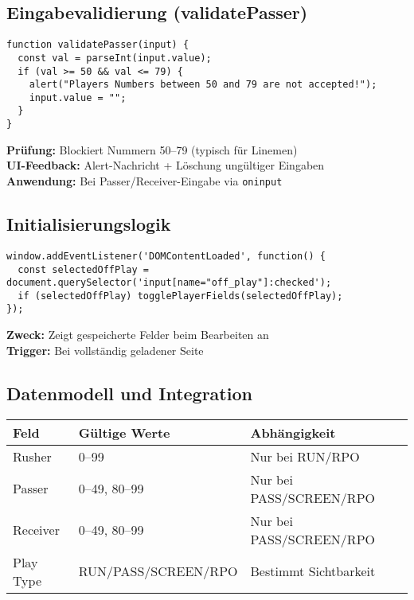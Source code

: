 \documentclass[12pt]{article}
\begin{document}
\subsection{Eingabevalidierung (validatePasser)}

\begin{verbatim}
function validatePasser(input) {
  const val = parseInt(input.value);
  if (val >= 50 && val <= 79) {
    alert("Players Numbers between 50 and 79 are not accepted!");
    input.value = "";
  }
}
\end{verbatim}

\textbf{Prüfung:} Blockiert Nummern 50–79 (typisch für Linemen) \\
\textbf{UI-Feedback:} Alert-Nachricht + Löschung ungültiger Eingaben \\
\textbf{Anwendung:} Bei Passer/Receiver-Eingabe via \texttt{oninput}


\subsection{Initialisierungslogik}

\begin{verbatim}
window.addEventListener('DOMContentLoaded', function() {
  const selectedOffPlay = document.querySelector('input[name="off_play"]:checked');
  if (selectedOffPlay) togglePlayerFields(selectedOffPlay);
});
\end{verbatim}

\textbf{Zweck:} Zeigt gespeicherte Felder beim Bearbeiten an \\
\textbf{Trigger:} Bei vollständig geladener Seite

\subsection{Datenmodell und Integration}

\begin{center}
\begin{tabular}{|l|l|l|}
\hline
\textbf{Feld} & \textbf{Gültige Werte} & \textbf{Abhängigkeit} \\
\hline
Rusher & 0–99 & Nur bei RUN/RPO \\
Passer & 0–49, 80–99 & Nur bei PASS/SCREEN/RPO \\
Receiver & 0–49, 80–99 & Nur bei PASS/SCREEN/RPO \\
Play Type & RUN/PASS/SCREEN/RPO & Bestimmt Sichtbarkeit \\
\hline
\end{tabular}
\end{center}
\end{document}
